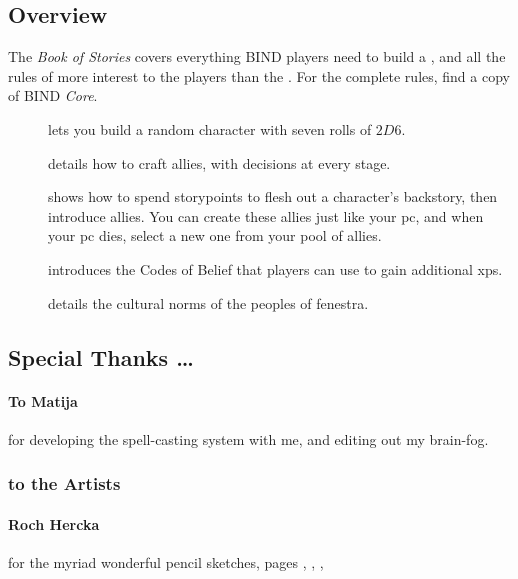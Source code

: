 \begin{multicols}{2}
\columnbreak

\subsection*{Overview}

The \textit{Book of Stories} covers everything BIND players need to build a , and all the rules of more interest to the players than the .
For the complete rules, find a copy of BIND \textit{Core}.

\begin{description}
  \item[]
  lets you build a random character with seven rolls of $2D6$.
  \item[]
  details how to craft allies, with decisions at every stage.
  \item[] shows how to spend \glspl{storypoint} to flesh out a character's backstory, then introduce allies.
  You can create these allies just like your \gls{pc}, and when your \gls{pc} dies, select a new one from your pool of allies.
  \item[] introduces the Codes of Belief that players can use to gain additional \glspl{xp}.
  \item[] details the cultural norms of the peoples of \gls{fenestra}.
\end{description}

\subsection*{Special Thanks \ldots}

\paragraph{To Matija}
for developing the spell-casting system with me, and editing out my brain-fog.

\subsubsection*{to the Artists}

\paragraph{Roch Hercka} for the myriad wonderful pencil sketches, pages 
\pageref{Roch_Hercka/five_races}, 
\pageref{Roch_Hercka/xp-1}, 
\pageref{Roch_Hercka/xp-2}, 


\end{multicols}
